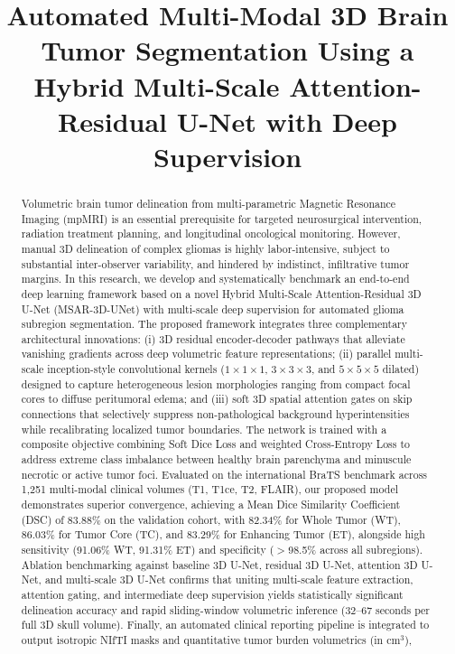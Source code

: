 \documentclass[conference]{IEEEtran}
\begin{document}
\title{Automated Multi-Modal 3D Brain Tumor Segmentation Using a Hybrid Multi-Scale Attention-Residual U-Net with Deep Supervision}

\author{
}

\maketitle

\begin{abstract}
Volumetric brain tumor delineation from multi-parametric Magnetic Resonance Imaging (mpMRI) is an essential prerequisite for targeted neurosurgical intervention, radiation treatment planning, and longitudinal oncological monitoring. However, manual 3D delineation of complex gliomas is highly labor-intensive, subject to substantial inter-observer variability, and hindered by indistinct, infiltrative tumor margins. In this research, we develop and systematically benchmark an end-to-end deep learning framework based on a novel Hybrid Multi-Scale Attention-Residual 3D U-Net (MSAR-3D-UNet) with multi-scale deep supervision for automated glioma subregion segmentation. The proposed framework integrates three complementary architectural innovations: (i) 3D residual encoder-decoder pathways that alleviate vanishing gradients across deep volumetric feature representations; (ii) parallel multi-scale inception-style convolutional kernels ($1\times 1\times 1$, $3\times 3\times 3$, and $5\times 5\times 5$ dilated) designed to capture heterogeneous lesion morphologies ranging from compact focal cores to diffuse peritumoral edema; and (iii) soft 3D spatial attention gates on skip connections that selectively suppress non-pathological background hyperintensities while recalibrating localized tumor boundaries. The network is trained with a composite objective combining Soft Dice Loss and weighted Cross-Entropy Loss to address extreme class imbalance between healthy brain parenchyma and minuscule necrotic or active tumor foci. Evaluated on the international BraTS benchmark across 1,251 multi-modal clinical volumes (T1, T1ce, T2, FLAIR), our proposed model demonstrates superior convergence, achieving a Mean Dice Similarity Coefficient (DSC) of 83.88\% on the validation cohort, with 82.34\% for Whole Tumor (WT), 86.03\% for Tumor Core (TC), and 83.29\% for Enhancing Tumor (ET), alongside high sensitivity (91.06\% WT, 91.31\% ET) and specificity ($>$98.5\% across all subregions). Ablation benchmarking against baseline 3D U-Net, residual 3D U-Net, attention 3D U-Net, and multi-scale 3D U-Net confirms that uniting multi-scale feature extraction, attention gating, and intermediate deep supervision yields statistically significant delineation accuracy and rapid sliding-window volumetric inference (32--67 seconds per full 3D skull volume). Finally, an automated clinical reporting pipeline is integrated to output isotropic NIfTI masks and quantitative tumor burden volumetrics (in cm$^3$), 
\end{abstract}
\end{document}
